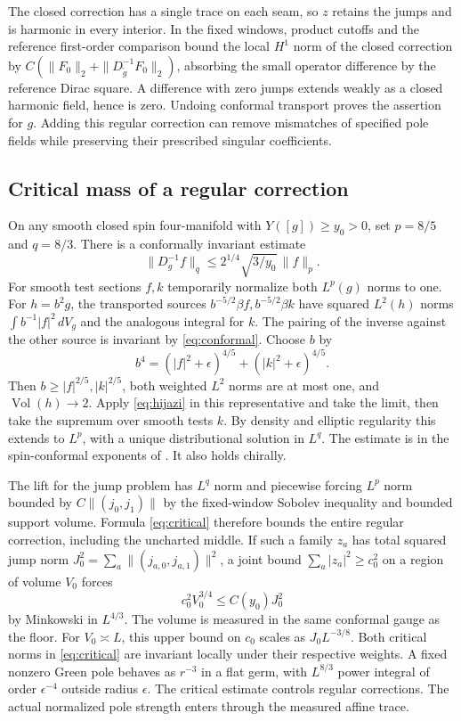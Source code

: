 \documentclass[11pt]{article}
\theoremstyle{remark}
\newcommand{\Vol}{\operatorname{Vol}}
\begin{document}
The closed correction has a single trace on each seam, so \(z\) retains the jumps and is harmonic in every interior. In the fixed windows, product cutoffs and the reference first-order comparison bound the local \(H^1\) norm of the closed correction by \(C(\|F_0\|_2+\|D_{\widetilde g}^{-1}F_0\|_2)\), absorbing the small operator difference by the reference Dirac square. A difference with zero jumps extends weakly as a closed harmonic field, hence is zero. Undoing conformal transport proves the assertion for \(g\). Adding this regular correction can remove mismatches of specified pole fields while preserving their prescribed singular coefficients.

\subsection{Critical mass of a regular correction}
On any smooth closed spin four-manifold with \(Y([g])\ge y_0>0\), set \(p=8/5\) and \(q=8/3\). There is a conformally invariant estimate
\begin{equation}
 \|D_g^{-1}f\|_q\le 2^{1/4}\sqrt{3/y_0}\,\|f\|_p.
 \label{eq:critical}
\end{equation}
For smooth test sections \(f,k\) temporarily normalize both \(L^p(g)\) norms to one. For \(h=b^2g\), the transported sources \(b^{-5/2}\beta f,b^{-5/2}\beta k\) have squared \(L^2(h)\) norms \(\int b^{-1}|f|^2\,dV_g\) and the analogous integral for \(k\). The pairing of the inverse against the other source is invariant by \eqref{eq:conformal}. Choose \(b\) by
\[
 b^4=(|f|^2+\epsilon)^{4/5}+(|k|^2+\epsilon)^{4/5}.
\]
Then \(b\ge |f|^{2/5},|k|^{2/5}\), both weighted \(L^2\) norms are at most one, and \(\Vol(h)\to2\). Apply \eqref{eq:hijazi} in this representative and take the limit, then take the supremum over smooth tests \(k\). By density and elliptic regularity this extends to \(L^p\), with a unique distributional solution in \(L^q\). The estimate is in the spin-conformal exponents of \cite[\S2.2]{Ammann2005SpinConformalClass}. It also holds chirally.

The lift for the jump problem has \(L^q\) norm and piecewise forcing \(L^p\) norm bounded by \(C\|(j_0,j_1)\|\) by the fixed-window Sobolev inequality and bounded support volume. Formula \eqref{eq:critical} therefore bounds the entire regular correction, including the uncharted middle. If such a family \(z_a\) has total squared jump norm \(J_0^2=\sum_a\|(j_{a,0},j_{a,1})\|^2\), a joint bound \(\sum_a|z_a|^2\ge c_0^2\) on a region of volume \(V_0\) forces
\[
 c_0^2 V_0^{3/4}\le C(y_0)J_0^2
\]
by Minkowski in \(L^{4/3}\). The volume is measured in the same conformal gauge as the floor. For \(V_0\asymp L\), this upper bound on \(c_0\) scales as \(J_0 L^{-3/8}\). Both critical norms in \eqref{eq:critical} are invariant locally under their respective weights. A fixed nonzero Green pole behaves as \(r^{-3}\) in a flat germ, with \(L^{8/3}\) power integral of order \(\epsilon^{-4}\) outside radius \(\epsilon\). The critical estimate controls regular corrections. The actual normalized pole strength enters through the measured affine trace.
\end{document}
